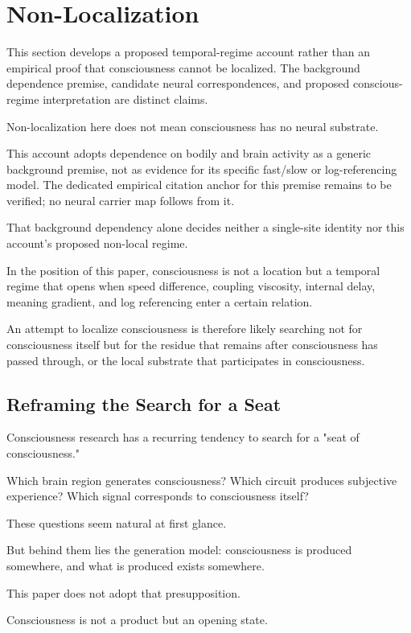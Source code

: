 \section{Non-Localization}


This section develops a proposed temporal-regime account rather than an empirical proof that consciousness cannot be localized. The background dependence premise, candidate neural correspondences, and proposed conscious-regime interpretation are distinct claims.

Non-localization here does not mean consciousness has no neural substrate.

This account adopts dependence on bodily and brain activity as a generic background premise, not as evidence for its specific fast/slow or log-referencing model. The dedicated empirical citation anchor for this premise remains to be verified; no neural carrier map follows from it.

That background dependency alone decides neither a single-site identity nor this account's proposed non-local regime.

In the position of this paper, consciousness is not a location but a temporal regime that opens when speed difference, coupling viscosity, internal delay, meaning gradient, and log referencing enter a certain relation.

An attempt to localize consciousness is therefore likely searching not for consciousness itself but for the residue that remains after consciousness has passed through, or the local substrate that participates in consciousness.

\subsection{Reframing the Search for a Seat}


Consciousness research has a recurring tendency to search for a "seat of consciousness."

Which brain region generates consciousness? Which circuit produces subjective experience? Which signal corresponds to consciousness itself?

These questions seem natural at first glance.

But behind them lies the generation model: consciousness is produced somewhere, and what is produced exists somewhere.

This paper does not adopt that presupposition.

Consciousness is not a product but an opening state.

